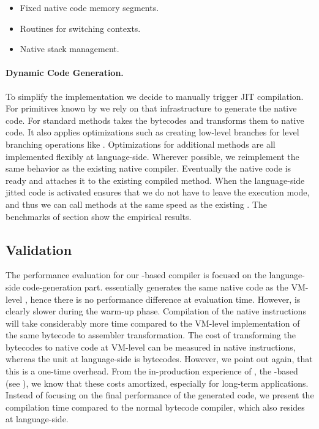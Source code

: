 \begin{itemize}
	\item Fixed native code memory segments.
	\item Routines for switching contexts.
	\item Native stack management.
\end{itemize}

\paragraph{Dynamic Code Generation.}
To simplify the implementation we decide to manually trigger JIT compilation.
For primitives known by \WF we rely on that infrastructure to generate the native code.
For standard methods \NBJ takes the bytecodes and transforms them to native code.
It also applies optimizations such as creating low-level branches for \ST level branching operations like .
Optimizations for additional methods are all implemented flexibly at language-side.
Wherever possible, we reimplement the same behavior as the existing native \JIT compiler.
Eventually the native code is ready and \B attaches it to the existing compiled method.
When the language-side jitted code is activated \B ensures that we do not have to leave the \JIT execution mode, and thus we can call methods at the same speed as the existing \JIT.
The benchmarks of section  show the empirical results.

\subsection{Validation}

The performance evaluation for our \B-based \JIT compiler is focused on the language-side code-generation part.
\NBJ essentially generates the same native code as the VM-level \JIT, hence there is no performance difference at evaluation time.
However, \NBJ is clearly slower during the warm-up phase.
Compilation of the native instructions will take considerably more time compared to the VM-level implementation of the same bytecode to assembler transformation.
The cost of transforming the bytecodes to native code at VM-level can be measured in native instructions, whereas the unit at language-side is bytecodes.
However, we point out again, that this is a one-time overhead.
From the in-production experience of \NB, the \B-based \FFI (see ), we know that these costs amortized, especially for long-term applications.
Instead of focusing on the final performance of the generated code, we present the compilation time compared to the normal \PH bytecode compiler, which also resides at language-side.

